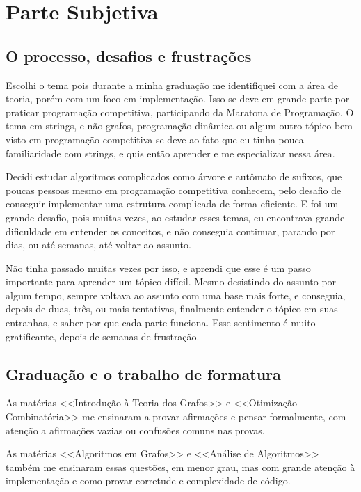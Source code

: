 \chapter*{Parte Subjetiva}

\setcounter{secnumdepth}{0}

\section{O processo, desafios e frustrações}

Escolhi o tema pois durante a minha graduação me identifiquei com a área de teoria, porém com um foco em implementação. Isso se deve em grande parte por praticar programação competitiva, participando da Maratona de Programação.
O tema em strings, e não grafos, programação dinâmica ou algum outro tópico bem visto em programação competitiva se deve ao fato que eu tinha pouca familiaridade com strings, e quis então aprender e me especializar nessa área.

Decidi estudar algoritmos complicados como árvore e autômato de sufixos, que poucas pessoas mesmo em programação competitiva conhecem, pelo desafio de conseguir implementar uma estrutura complicada de forma eficiente.
E foi um grande desafio, pois muitas vezes, ao estudar esses temas, eu encontrava grande dificuldade em entender os conceitos, e não conseguia continuar, parando por dias, ou até semanas, até voltar ao assunto.

Não tinha passado muitas vezes por isso, e aprendi que esse é um passo importante para aprender um tópico difícil. Mesmo desistindo do assunto por algum tempo, sempre voltava ao assunto com uma base mais forte, e conseguia, depois de duas, três, ou mais tentativas, finalmente entender o tópico em suas entranhas, e saber por que cada parte funciona. Esse sentimento é muito gratificante, depois de semanas de frustração.

\section{Graduação e o trabalho de formatura}

As matérias <<Introdução à Teoria dos Grafos>> e <<Otimização Combinatória>> me ensinaram a provar afirmações e pensar formalmente, com atenção a afirmações vazias ou confusões comuns nas provas.

As matérias <<Algoritmos em Grafos>> e <<Análise de Algoritmos>> também me ensinaram essas questões, em menor grau, mas com grande atenção à implementação e como provar corretude e complexidade de código.

